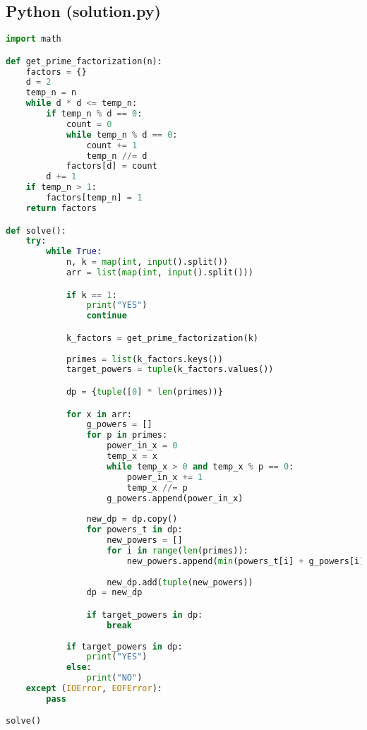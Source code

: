 \documentclass[11pt,a4paper]{article}
\begin{document}
\subsection*{Python (solution.py)}
\begin{lstlisting}[language=Python]
import math

def get_prime_factorization(n):
    factors = {}
    d = 2
    temp_n = n
    while d * d <= temp_n:
        if temp_n % d == 0:
            count = 0
            while temp_n % d == 0:
                count += 1
                temp_n //= d
            factors[d] = count
        d += 1
    if temp_n > 1:
        factors[temp_n] = 1
    return factors

def solve():
    try:
        while True:
            n, k = map(int, input().split())
            arr = list(map(int, input().split()))

            if k == 1:
                print("YES")
                continue

            k_factors = get_prime_factorization(k)
            
            primes = list(k_factors.keys())
            target_powers = tuple(k_factors.values())

            dp = {tuple([0] * len(primes))}

            for x in arr:
                g_powers = []
                for p in primes:
                    power_in_x = 0
                    temp_x = x
                    while temp_x > 0 and temp_x % p == 0:
                        power_in_x += 1
                        temp_x //= p
                    g_powers.append(power_in_x)
                
                new_dp = dp.copy()
                for powers_t in dp:
                    new_powers = []
                    for i in range(len(primes)):
                        new_powers.append(min(powers_t[i] + g_powers[i], target_powers[i]))
                    
                    new_dp.add(tuple(new_powers))
                dp = new_dp

                if target_powers in dp:
                    break
            
            if target_powers in dp:
                print("YES")
            else:
                print("NO")
    except (IOError, EOFError):
        pass

solve()
\end{lstlisting}
\end{document}
